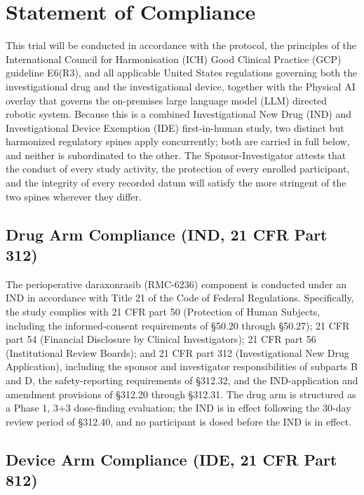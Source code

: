 \section{Statement of Compliance}

This trial will be conducted in accordance with the protocol, the principles of
the International Council for Harmonisation (ICH) Good Clinical Practice (GCP)
guideline E6(R3), and all applicable United States regulations governing both
the investigational drug and the investigational device, together with the
Physical AI overlay that governs the on-premises large language model (LLM)
directed robotic system. Because this is a combined Investigational New Drug
(IND) and Investigational Device Exemption (IDE) first-in-human study, two
distinct but harmonized regulatory spines apply concurrently; both are carried
in full below, and neither is subordinated to the other. The Sponsor-Investigator
attests that the conduct of every study activity, the protection of every
enrolled participant, and the integrity of every recorded datum will satisfy the
more stringent of the two spines wherever they differ.

\subsection{Drug Arm Compliance (IND, 21 CFR Part 312)}

The perioperative daraxonrasib (RMC-6236) component is conducted under an IND in
accordance with Title 21 of the Code of Federal Regulations. Specifically, the
study complies with 21 CFR part 50 (Protection of Human Subjects, including the
informed-consent requirements of \S50.20 through \S50.27); 21 CFR part 54
(Financial Disclosure by Clinical Investigators); 21 CFR part 56 (Institutional
Review Boards); and 21 CFR part 312 (Investigational New Drug Application),
including the sponsor and investigator responsibilities of subparts B and D, the
safety-reporting requirements of \S312.32, and the IND-application and amendment
provisions of \S312.20 through \S312.31. The drug arm is structured as a Phase 1,
3+3 dose-finding evaluation; the IND is in effect following the 30-day review
period of \S312.40, and no participant is dosed before the IND is in effect.

\subsection{Device Arm Compliance (IDE, 21 CFR Part 812)}

